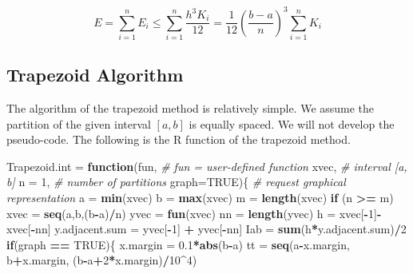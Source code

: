 \documentclass[
]{book}
\newenvironment{Shaded}{\begin{snugshade}}{\end{snugshade}}
\newcommand{\AttributeTok}[1]{\textcolor[rgb]{0.13,0.29,0.53}{#1}}
\newcommand{\CommentTok}[1]{\textcolor[rgb]{0.56,0.35,0.01}{\textit{#1}}}
\newcommand{\ConstantTok}[1]{\textcolor[rgb]{0.56,0.35,0.01}{#1}}
\newcommand{\ControlFlowTok}[1]{\textcolor[rgb]{0.13,0.29,0.53}{\textbf{#1}}}
\newcommand{\DecValTok}[1]{\textcolor[rgb]{0.00,0.00,0.81}{#1}}
\newcommand{\FloatTok}[1]{\textcolor[rgb]{0.00,0.00,0.81}{#1}}
\newcommand{\FunctionTok}[1]{\textcolor[rgb]{0.13,0.29,0.53}{\textbf{#1}}}
\newcommand{\NormalTok}[1]{#1}
\newcommand{\OtherTok}[1]{\textcolor[rgb]{0.56,0.35,0.01}{#1}}
\newcommand{\SpecialCharTok}[1]{\textcolor[rgb]{0.81,0.36,0.00}{\textbf{#1}}}
\begin{document}
\[
E=\sum_{i=1}^n E_i  \le \sum_{i=1}^n \frac{h^3 K_i}{12} = \frac{1}{12}\left( \frac{b-a}{n}\right)^3\sum_{i=1}^nK_i
\]

\hypertarget{trapezoid-algorithm}{%
\subsection{Trapezoid Algorithm}\label{trapezoid-algorithm}}

The algorithm of the trapezoid method is relatively simple. We assume the partition of the given interval \([a, b]\) is equally spaced. We will not develop the pseudo-code. The following is the R function of the trapezoid method.

\begin{Shaded}
\begin{Highlighting}[]
\NormalTok{Trapezoid.int }\OtherTok{=} \ControlFlowTok{function}\NormalTok{(fun,          }\CommentTok{\# fun = user{-}defined function}
\NormalTok{                         xvec,         }\CommentTok{\# interval [a, b] }
                         \AttributeTok{n =} \DecValTok{1}\NormalTok{,        }\CommentTok{\# number of partitions}
                         \AttributeTok{graph=}\ConstantTok{TRUE}\NormalTok{)\{  }\CommentTok{\# request graphical representation}
\NormalTok{  a }\OtherTok{=} \FunctionTok{min}\NormalTok{(xvec)}
\NormalTok{  b }\OtherTok{=} \FunctionTok{max}\NormalTok{(xvec)}
\NormalTok{  m }\OtherTok{=} \FunctionTok{length}\NormalTok{(xvec)}
  \ControlFlowTok{if}\NormalTok{ (n }\SpecialCharTok{\textgreater{}=}\NormalTok{ m) xvec }\OtherTok{=} \FunctionTok{seq}\NormalTok{(a,b,(b}\SpecialCharTok{{-}}\NormalTok{a)}\SpecialCharTok{/}\NormalTok{n)}
\NormalTok{  yvec }\OtherTok{=} \FunctionTok{fun}\NormalTok{(xvec)}
\NormalTok{  nn }\OtherTok{=} \FunctionTok{length}\NormalTok{(yvec)}
\NormalTok{  h }\OtherTok{=}\NormalTok{ xvec[}\SpecialCharTok{{-}}\DecValTok{1}\NormalTok{]}\SpecialCharTok{{-}}\NormalTok{ xvec[}\SpecialCharTok{{-}}\NormalTok{nn]}
\NormalTok{  y.adjacent.sum }\OtherTok{=}\NormalTok{  yvec[}\SpecialCharTok{{-}}\DecValTok{1}\NormalTok{] }\SpecialCharTok{+}\NormalTok{ yvec[}\SpecialCharTok{{-}}\NormalTok{nn]}
\NormalTok{  Iab }\OtherTok{=} \FunctionTok{sum}\NormalTok{(h}\SpecialCharTok{*}\NormalTok{y.adjacent.sum)}\SpecialCharTok{/}\DecValTok{2}
  \ControlFlowTok{if}\NormalTok{(graph }\SpecialCharTok{==} \ConstantTok{TRUE}\NormalTok{)\{}
\NormalTok{      x.margin }\OtherTok{=} \FloatTok{0.1}\SpecialCharTok{*}\FunctionTok{abs}\NormalTok{(b}\SpecialCharTok{{-}}\NormalTok{a)}
\NormalTok{      tt }\OtherTok{=} \FunctionTok{seq}\NormalTok{(a}\SpecialCharTok{{-}}\NormalTok{x.margin, b}\SpecialCharTok{+}\NormalTok{x.margin, (b}\SpecialCharTok{{-}}\NormalTok{a}\SpecialCharTok{+}\DecValTok{2}\SpecialCharTok{*}\NormalTok{x.margin)}\SpecialCharTok{/}\DecValTok{10}\SpecialCharTok{\^{}}\DecValTok{4}\NormalTok{)}

\end{Highlighting}
\end{Shaded}
\end{document}
